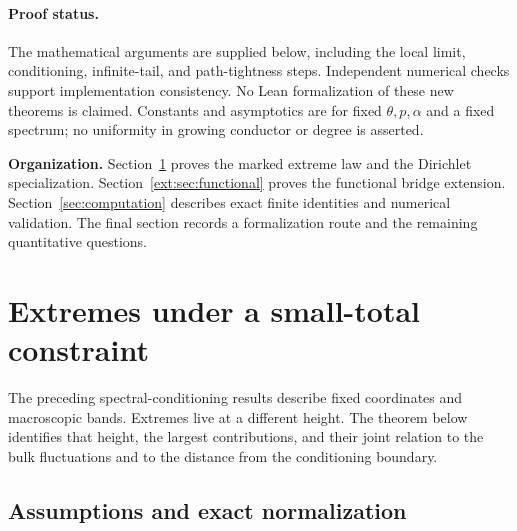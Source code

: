 \documentclass[11pt]{article}
\theoremstyle{definition}
\theoremstyle{remark}
\begin{document}
\paragraph{Proof status.}
The mathematical arguments are supplied below, including the local limit,
conditioning, infinite-tail, and path-tightness steps. Independent numerical
checks support implementation consistency. No Lean formalization of these
new theorems is claimed. Constants and asymptotics are for fixed
$\theta,p,\alpha$ and a fixed spectrum; no uniformity in growing conductor or
degree is asserted.

\medskip
\noindent\textbf{Organization.} Section~\ref{sec:extremes} proves the marked
extreme law and the Dirichlet specialization. Section~\ref{ext:sec:functional}
proves the functional bridge extension. Section~\ref{sec:computation}
describes exact finite identities and numerical validation. The final
section records a formalization route and the remaining quantitative questions.


\section{Extremes under a small-total constraint}
\label{sec:extremes}

The preceding spectral-conditioning results describe fixed coordinates and
macroscopic bands.  Extremes live at a different height.  The theorem below
identifies that height, the largest contributions, and their joint relation
to the bulk fluctuations and to the distance from the conditioning boundary.

\subsection{Assumptions and exact normalization}
\end{document}
